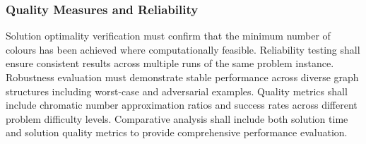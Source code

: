 \subsubsection{Quality Measures and Reliability}
Solution optimality verification must confirm that the minimum number of colours has been achieved where computationally feasible. Reliability testing shall ensure consistent results across multiple runs of the same problem instance. Robustness evaluation must demonstrate stable performance across diverse graph structures including worst-case and adversarial examples. Quality metrics shall include chromatic number approximation ratios and success rates across different problem difficulty levels. Comparative analysis shall include both solution time and solution quality metrics to provide comprehensive performance evaluation.
